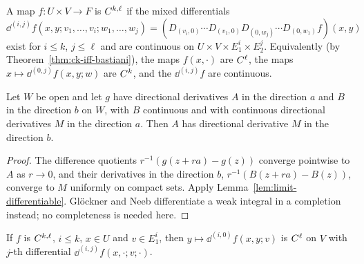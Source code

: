 \begin{definition}
  \label{def:ckl}
  \leanok
  A map $f \colon U \times V \to F$ is $C^{k,\ell}$ if the mixed differentials
  \[
    \dd^{(i,j)} f(x, y; v_1, \dots, v_i; w_1, \dots, w_j)
      = (D_{(v_i,0)} \cdots D_{(v_1,0)} D_{(0,w_j)} \cdots D_{(0,w_1)} f)(x, y)
  \]
  exist for $i \leq k$, $j \leq \ell$ and are continuous on $U \times V \times E_1^i \times E_2^j$.
  Equivalently (by Theorem~\ref{thm:ck-iff-bastiani}), the maps $f(x, \cdot)$ are $C^{\ell}$,
  the maps $x \mapsto \dd^{(0,j)} f(x, y; w)$ are $C^{k}$, and the $\dd^{(i,j)} f$ are
  continuous.
\end{definition}

\begin{lemma}
  \label{lem:mixed-partials}
  \leanok
  Let $W$ be open and let $g$ have directional derivatives $A$ in the direction $a$ and $B$ in
  the direction $b$ on $W$, with $B$ continuous and with continuous directional derivatives $M$
  in the direction $a$. Then $A$ has directional derivative $M$ in the direction $b$.
\end{lemma}

\begin{proof}
  \leanok
  The difference quotients $r^{-1}(g(z + ra) - g(z))$ converge pointwise to $A$ as $r \to 0$,
  and their derivatives in the direction $b$, $r^{-1}(B(z + ra) - B(z))$, converge to $M$
  uniformly on compact sets. Apply Lemma~\ref{lem:limit-differentiable}. Glöckner and Neeb
  differentiate a weak integral in a completion instead; no completeness is needed here.
\end{proof}

\begin{proposition}
  \label{prop:ckl-schwarz}
  \leanok
  If $f$ is $C^{k,\ell}$, $i \leq k$, $x \in U$ and $v \in E_1^i$, then
  $y \mapsto \dd^{(i,0)} f(x, y; v)$ is $C^{\ell}$ on $V$ with $j$-th differential
  $\dd^{(i,j)} f(x, \cdot; v; \cdot)$.
\end{proposition}

